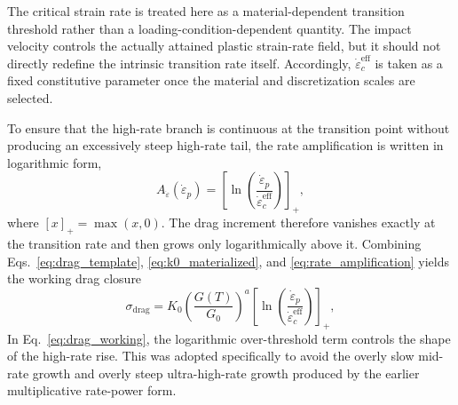 The critical strain rate is treated here as a material-dependent transition threshold rather than a loading-condition-dependent quantity. The impact velocity controls the actually attained plastic strain-rate field, but it should not directly redefine the intrinsic transition rate itself. Accordingly, $\dot{\varepsilon}^{\mathrm{eff}}_c$ is taken as a fixed constitutive parameter once the material and discretization scales are selected.

To ensure that the high-rate branch is continuous at the transition point without producing an excessively steep high-rate tail, the rate amplification is written in logarithmic form,
\begin{equation}
A_{\dot{\varepsilon}}(\dot{\varepsilon}_p)=
\left[
\ln\left(\frac{\dot{\varepsilon}_p}{\dot{\varepsilon}^{\mathrm{eff}}_c}\right)
\right]_+,
\label{eq:rate_amplification}
\end{equation}
where $[x]_+=\max(x,0)$. The drag increment therefore vanishes exactly at the transition rate and then grows only logarithmically above it. Combining Eqs.~\eqref{eq:drag_template}, \eqref{eq:k0_materialized}, and \eqref{eq:rate_amplification} yields the working drag closure
\begin{equation}
\sigma_{\mathrm{drag}}=
K_0
\left(\frac{G(T)}{G_0}\right)^a
\left[
\ln\left(\frac{\dot{\varepsilon}_p}{\dot{\varepsilon}^{\mathrm{eff}}_c}\right)
\right]_+
\!,
\label{eq:drag_working}
\end{equation}
In Eq.~\eqref{eq:drag_working}, the logarithmic over-threshold term controls the shape of the high-rate rise. This was adopted specifically to avoid the overly slow mid-rate growth and overly steep ultra-high-rate growth produced by the earlier multiplicative rate-power form.

